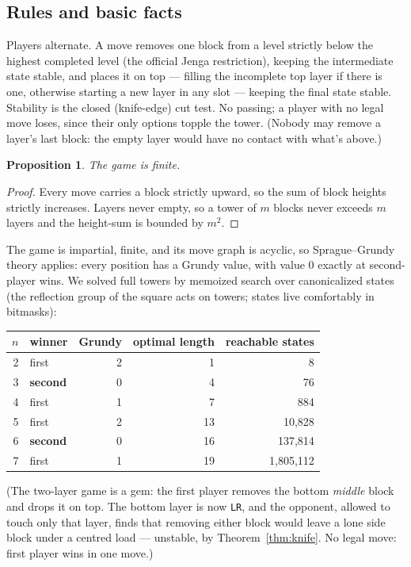 \documentclass[11pt]{article}
\newtheorem{proposition}[theorem]{Proposition}
\theoremstyle{definition}
\theoremstyle{remark}
\newcommand{\layer}[1]{\texttt{#1}}
\begin{document}
\subsection{Rules and basic facts}

Players alternate. A move removes one block from a level strictly below the
highest completed level (the official Jenga restriction), keeping the
intermediate state stable, and places it on top --- filling the incomplete
top layer if there is one, otherwise starting a new layer in any slot ---
keeping the final state stable. Stability is the closed (knife-edge) cut
test. No passing; a player with no legal move loses, since their only
options topple the tower. (Nobody may remove a layer's last block: the
empty layer would have no contact with what's above.)

\begin{proposition}
The game is finite.
\end{proposition}

\begin{proof}
Every move carries a block strictly upward, so the sum of block heights
strictly increases. Layers never empty, so a tower of $m$ blocks never
exceeds $m$ layers and the height-sum is bounded by $m^2$.
\end{proof}

The game is impartial, finite, and its move graph is acyclic, so
Sprague--Grundy theory applies: every position has a Grundy value, with
value $0$ exactly at second-player wins. We solved full towers by memoized
search over canonicalized states (the reflection group of the square acts
on towers; states live comfortably in bitmasks):

\begin{center}
\begin{tabular}{rlrrr}
\toprule
$n$ & winner & Grundy & optimal length & reachable states \\
\midrule
2 & first & 2 & 1 & 8 \\
3 & \textbf{second} & 0 & 4 & 76 \\
4 & first & 1 & 7 & 884 \\
5 & first & 2 & 13 & 10{,}828 \\
6 & \textbf{second} & 0 & 16 & 137{,}814 \\
7 & first & 1 & 19 & 1{,}805{,}112 \\
\bottomrule
\end{tabular}
\end{center}

(The two-layer game is a gem: the first player removes the bottom
\emph{middle} block and drops it on top. The bottom layer is now
\layer{LR}, and the opponent, allowed to touch only that layer, finds that
removing either block would leave a lone side block under a centred load
--- unstable, by Theorem~\ref{thm:knife}. No legal move: first player wins
in one move.)
\end{document}

